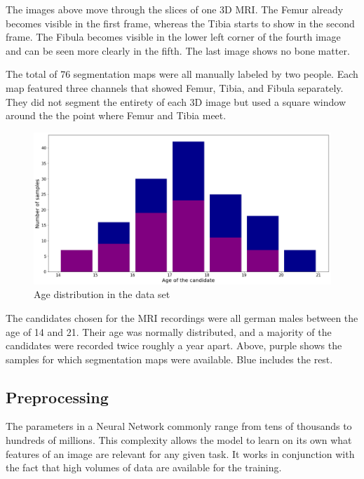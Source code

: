 The images above move through the slices of one 3D MRI. The Femur already becomes visible in the first frame, whereas the Tibia starts to show in the second frame. The Fibula becomes visible in the lower left corner of the fourth image and can be seen more clearly in the fifth. The last image shows no bone matter.

The total of 76 segmentation maps were all manually labeled by two people. Each map featured three channels that showed Femur, Tibia, and Fibula separately. They did not segment the entirety of each 3D image but used a square window around the the point where Femur and Tibia meet.

\begin{figure}[H]
\centering
\par
\includegraphics[width=1.0\textwidth]{imgs/age_distr.png}
\caption{Age distribution in the data set}
\par
\end{figure}

The candidates chosen for the MRI recordings were all german males between the age of 14 and 21. Their age was normally distributed, and a majority of the candidates were recorded twice roughly a year apart. Above, purple shows the samples for which segmentation maps were available. Blue includes the rest.

\subsection{Preprocessing}

The parameters in a Neural Network commonly range from tens of thousands to hundreds of millions. This complexity allows the model to learn on its own what features of an image are relevant for any given task. It works in conjunction with the fact that high volumes of data are available for the training.


